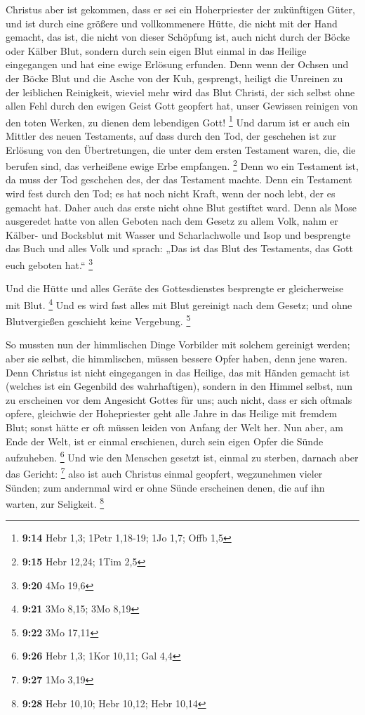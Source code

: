  Christus aber ist gekommen, dass er sei ein Hoherpriester
der zukünftigen Güter, und ist durch eine größere und vollkommenere
Hütte, die nicht mit der Hand gemacht, das ist, die nicht von dieser
Schöpfung ist,  auch nicht durch der Böcke oder Kälber
Blut, sondern durch sein eigen Blut einmal in das Heilige eingegangen
und hat eine ewige Erlösung erfunden.  Denn wenn der Ochsen
und der Böcke Blut und die Asche von der Kuh, gesprengt, heiligt die
Unreinen zu der leiblichen Reinigkeit,  wieviel mehr wird
das Blut Christi, der sich selbst ohne allen Fehl durch den ewigen Geist
Gott geopfert hat, unser Gewissen reinigen von den toten Werken, zu
dienen dem lebendigen Gott! \footnote{\textbf{9:14} Hebr 1,3; 1Petr
  1,18-19; 1Jo 1,7; Offb 1,5}  Und darum ist er auch ein
Mittler des neuen Testaments, auf dass durch den Tod, der geschehen ist
zur Erlösung von den Übertretungen, die unter dem ersten Testament
waren, die, die berufen sind, das verheißene ewige Erbe empfangen.
\footnote{\textbf{9:15} Hebr 12,24; 1Tim 2,5}  Denn wo ein
Testament ist, da muss der Tod geschehen des, der das Testament machte.
 Denn ein Testament wird fest durch den Tod; es hat noch
nicht Kraft, wenn der noch lebt, der es gemacht hat.  Daher
auch das erste nicht ohne Blut gestiftet ward.  Denn als
Mose ausgeredet hatte von allen Geboten nach dem Gesetz zu allem Volk,
nahm er Kälber- und Bocksblut mit Wasser und Scharlachwolle und Isop und
besprengte das Buch und alles Volk  und sprach: „Das ist
das Blut des Testaments, das Gott euch geboten hat.`` \footnote{\textbf{9:20}
  4Mo 19,6}

 Und die Hütte und alles Geräte des Gottesdienstes
besprengte er gleicherweise mit Blut. \footnote{\textbf{9:21} 3Mo 8,15;
  3Mo 8,19}  Und es wird fast alles mit Blut gereinigt nach
dem Gesetz; und ohne Blutvergießen geschieht keine Vergebung.
\footnote{\textbf{9:22} 3Mo 17,11}

 So mussten nun der himmlischen Dinge Vorbilder mit solchem
gereinigt werden; aber sie selbst, die himmlischen, müssen bessere Opfer
haben, denn jene waren.  Denn Christus ist nicht
eingegangen in das Heilige, das mit Händen gemacht ist (welches ist ein
Gegenbild des wahrhaftigen), sondern in den Himmel selbst, nun zu
erscheinen vor dem Angesicht Gottes für uns;  auch nicht,
dass er sich oftmals opfere, gleichwie der Hohepriester geht alle Jahre
in das Heilige mit fremdem Blut;  sonst hätte er oft müssen
leiden von Anfang der Welt her. Nun aber, am Ende der Welt, ist er
einmal erschienen, durch sein eigen Opfer die Sünde aufzuheben.
\footnote{\textbf{9:26} Hebr 1,3; 1Kor 10,11; Gal 4,4}  Und
wie den Menschen gesetzt ist, einmal zu sterben, darnach aber das
Gericht: \footnote{\textbf{9:27} 1Mo 3,19}  also ist auch
Christus einmal geopfert, wegzunehmen vieler Sünden; zum andernmal wird
er ohne Sünde erscheinen denen, die auf ihn warten, zur Seligkeit.
\footnote{\textbf{9:28} Hebr 10,10; Hebr 10,12; Hebr 10,14}

